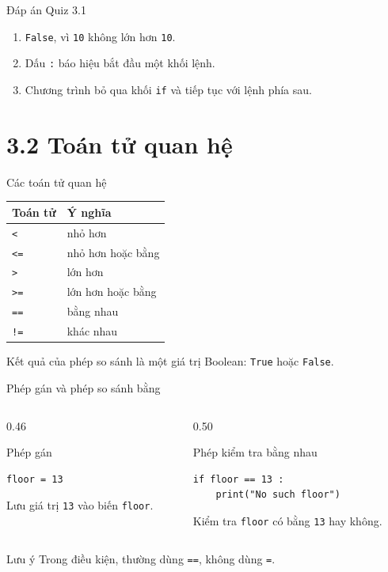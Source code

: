 \documentclass[aspectratio=169,11pt]{beamer}
\newcommand{\code}[1]{\texttt{#1}}
\begin{document}
\begin{frame}{Đáp án Quiz 3.1}
\begin{enumerate}
  \item \code{False}, vì \code{10} không lớn hơn \code{10}.
  \item Dấu \code{:} báo hiệu bắt đầu một khối lệnh.
  \item Chương trình bỏ qua khối \code{if} và tiếp tục với lệnh phía sau.
\end{enumerate}
\end{frame}

\section{3.2 Toán tử quan hệ}

\begin{frame}{Các toán tử quan hệ}
\begin{center}
\begin{tabular}{ll}
\toprule
Toán tử & Ý nghĩa \\
\midrule
\code{<}  & nhỏ hơn \\
\code{<=} & nhỏ hơn hoặc bằng \\
\code{>}  & lớn hơn \\
\code{>=} & lớn hơn hoặc bằng \\
\code{==} & bằng nhau \\
\code{!=} & khác nhau \\
\bottomrule
\end{tabular}
\end{center}
\vspace{0.7em}
Kết quả của phép so sánh là một giá trị Boolean: \code{True} hoặc \code{False}.
\end{frame}

\begin{frame}[fragile]{Phép gán và phép so sánh bằng}
\begin{columns}[T]
\begin{column}{0.46\textwidth}
\begin{block}{Phép gán}
\begin{lstlisting}[style=py]
floor = 13
\end{lstlisting}
Lưu giá trị \code{13} vào biến \code{floor}.
\end{block}
\end{column}
\begin{column}{0.50\textwidth}
\begin{block}{Phép kiểm tra bằng nhau}
\begin{lstlisting}[style=py]
if floor == 13 :
    print("No such floor")
\end{lstlisting}
Kiểm tra \code{floor} có bằng \code{13} hay không.
\end{block}
\end{column}
\end{columns}
\begin{alertblock}{Lưu ý}
Trong điều kiện, thường dùng \code{==}, không dùng \code{=}.
\end{alertblock}
\end{frame}
\end{document}
